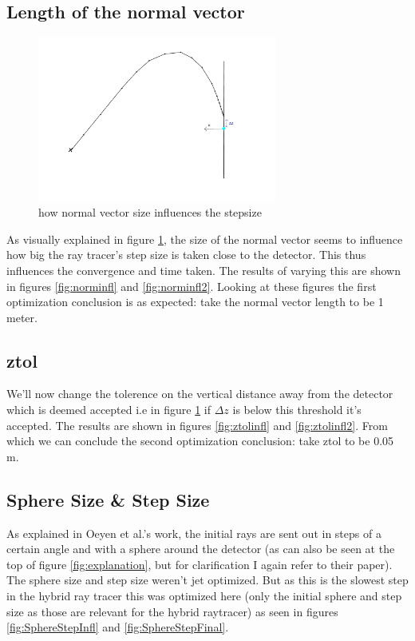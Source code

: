 \documentclass[11pt,a4paper,faculty=we,language=en,doctype=report]{cls/ugent-doc}
\begin{document}
\subsection{Length of the normal vector}
\begin{figure}[h!]
	\centering
	\includegraphics[width=0.7\textwidth]{figures/PrincipleNormIllu.pdf}
	\caption{how normal vector size influences the stepsize}
	\label{fig:normexpl}
\end{figure}
As visually explained in figure \ref{fig:normexpl}, the size of the normal vector seems to
influence how big the ray tracer's step size is taken close to the detector. This
thus influences the convergence and time taken. The results of varying this are shown
in figures \ref{fig:norminfl} and \ref{fig:norminfl2}.
Looking at these figures the first optimization conclusion is as expected: 
take the normal vector length to be 1 meter.
\subsection{ztol}
We'll now change the tolerence on the vertical distance away from the detector which is deemed
accepted i.e in figure \ref{fig:normexpl} if $\Delta z$ is below this threshold it's accepted.
The results are shown in figures \ref{fig:ztolinfl} and \ref{fig:ztolinfl2}.
From which we can conclude the second optimization conclusion: take ztol to be 0.05 m.
\subsection{Sphere Size \& Step Size}
As explained in Oeyen et al.'s work, the initial rays are sent out in steps of a
certain angle and with a sphere around the detector (as can also be seen at the top of
figure \ref{fig:explanation}, but for clarification I again refer to their
paper). The sphere size and step size weren't jet optimized. But as
this is the slowest step in the hybrid ray tracer this was optimized here (only
the initial sphere and step size as those are relevant for the hybrid
raytracer) as seen in figures \ref{fig:SphereStepInfl} and \ref{fig:SphereStepFinal}.
\end{document}
